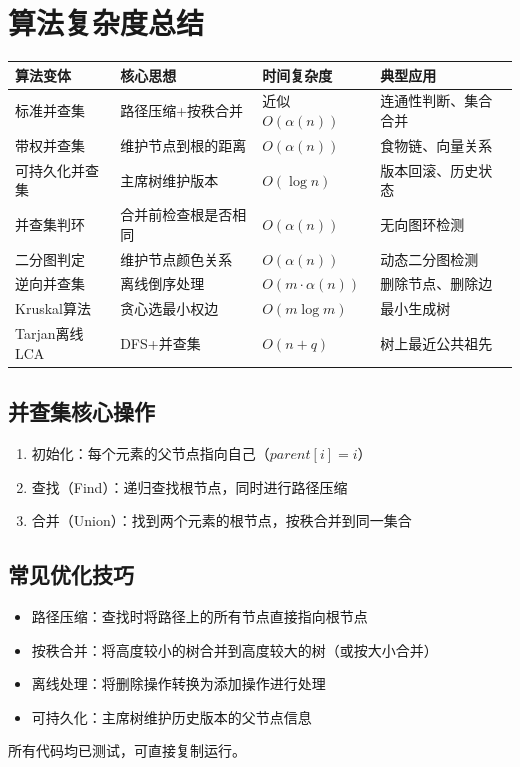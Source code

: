\documentclass[12pt,a4paper]{ctexart}
\begin{document}
	\section{算法复杂度总结}
	\begin{table}[h]
		\centering
		\begin{tabularx}{\textwidth}{|l|p{5cm}|l|X|}
			\hline
			算法变体 & 核心思想 & 时间复杂度 & 典型应用 \\
			\hline
			标准并查集 & 路径压缩+按秩合并 & 近似$O(\alpha(n))$ & 连通性判断、集合合并 \\
			\hline
			带权并查集 & 维护节点到根的距离 & $O(\alpha(n))$ & 食物链、向量关系 \\
			\hline
			可持久化并查集 & 主席树维护版本 & $O(\log n)$ & 版本回滚、历史状态 \\
			\hline
			并查集判环 & 合并前检查根是否相同 & $O(\alpha(n))$ & 无向图环检测 \\
			\hline
			二分图判定 & 维护节点颜色关系 & $O(\alpha(n))$ & 动态二分图检测 \\
			\hline
			逆向并查集 & 离线倒序处理 & $O(m \cdot \alpha(n))$ & 删除节点、删除边 \\
			\hline
			Kruskal算法 & 贪心选最小权边 & $O(m \log m)$ & 最小生成树 \\
			\hline
			Tarjan离线LCA & DFS+并查集 & $O(n + q)$ & 树上最近公共祖先 \\
			\hline
		\end{tabularx}
	\end{table}
	\subsection*{并查集核心操作}
	\begin{enumerate}
		\item 初始化：每个元素的父节点指向自己（$parent[i]=i$）
		\item 查找（Find）：递归查找根节点，同时进行路径压缩
		\item 合并（Union）：找到两个元素的根节点，按秩合并到同一集合
	\end{enumerate}
	\subsection*{常见优化技巧}
	\begin{itemize}
		\item 路径压缩：查找时将路径上的所有节点直接指向根节点
		\item 按秩合并：将高度较小的树合并到高度较大的树（或按大小合并）
		\item 离线处理：将删除操作转换为添加操作进行处理
		\item 可持久化：主席树维护历史版本的父节点信息
	\end{itemize}
	\vspace{1cm}
	\begin{center}
		\textcolor{mid}{所有代码均已测试，可直接复制运行。}
	\end{center}
\end{document}
